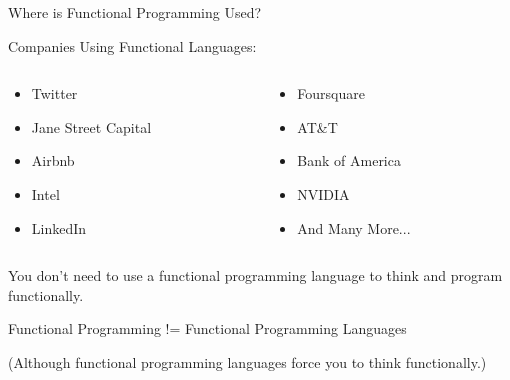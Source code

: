 \documentclass[8pt,aspectratio=169]{beamer}
\begin{document}
\begin{frame}{Where is Functional Programming Used?}

\pause
Companies Using Functional Languages:

\begin{columns}[onlytextwidth]
\begin{column}{0.5\textwidth}
\begin{center}
\begin{itemize}
  \item Twitter
  \item Jane Street Capital
  \item Airbnb
  \item Intel
  \item LinkedIn
\end{itemize}
\end{center}
\end{column}
\begin{column}{0.5\textwidth}
\begin{center}
\begin{itemize}
  \item Foursquare
  \item AT\&T
  \item Bank of America
  \item NVIDIA
  \item And Many More...
\end{itemize}
\end{center}
\end{column}
\end{columns}

\vspace{10mm}

\pause
You don't need to use a functional programming language to think and program functionally.
\newline

\pause
\hspace*{20pt}
Functional Programming != Functional Programming Languages

\pause
\hspace*{20pt}
(Although functional programming languages force you to think functionally.)
\newline

\end{frame}

\end{document}
